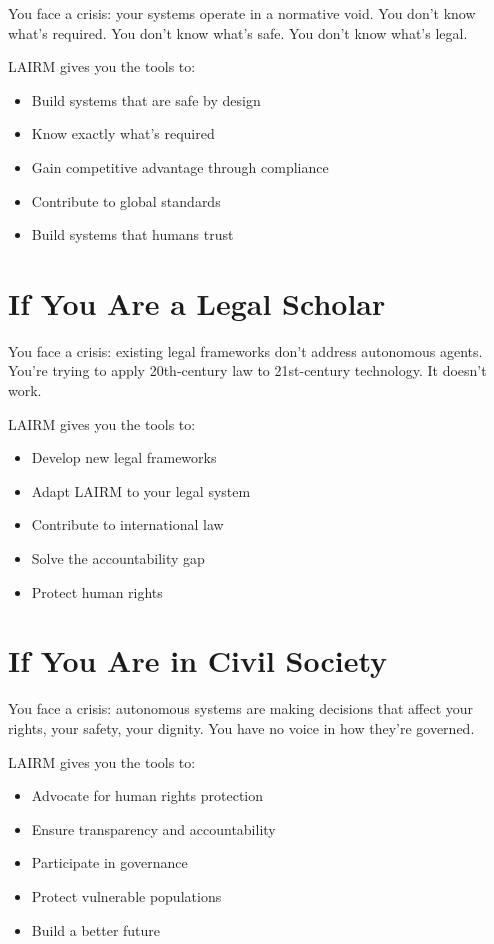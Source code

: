 \documentclass[12pt,a4paper,twoside,openright]{book}
\begin{document}
You face a crisis: your systems operate in a normative void. You don't know what's required. You don't know what's safe. You don't know what's legal.

LAIRM gives you the tools to:
\begin{itemize}
    \item Build systems that are safe by design
    \item Know exactly what's required
    \item Gain competitive advantage through compliance
    \item Contribute to global standards
    \item Build systems that humans trust
\end{itemize}

\section*{If You Are a Legal Scholar}

You face a crisis: existing legal frameworks don't address autonomous agents. You're trying to apply 20th-century law to 21st-century technology. It doesn't work.

LAIRM gives you the tools to:
\begin{itemize}
    \item Develop new legal frameworks
    \item Adapt LAIRM to your legal system
    \item Contribute to international law
    \item Solve the accountability gap
    \item Protect human rights
\end{itemize}

\section*{If You Are in Civil Society}

You face a crisis: autonomous systems are making decisions that affect your rights, your safety, your dignity. You have no voice in how they're governed.

LAIRM gives you the tools to:
\begin{itemize}
    \item Advocate for human rights protection
    \item Ensure transparency and accountability
    \item Participate in governance
    \item Protect vulnerable populations
    \item Build a better future
\end{itemize}
\end{document}
